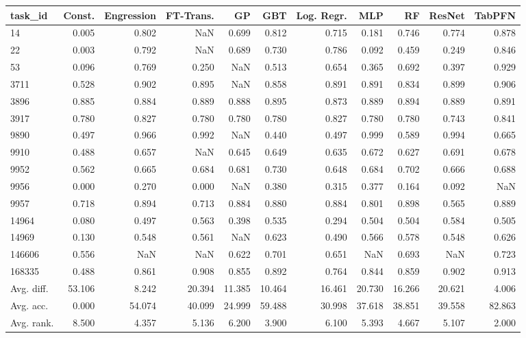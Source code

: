 \begin{tabular}{lrrrrrrrrrr}
\toprule
task\_id & Const. & Engression & FT-Trans. & GP & GBT & Log. Regr. & MLP & RF & ResNet & TabPFN \\
\midrule
14 & 0.005 & 0.802 & NaN & 0.699 & 0.812 & 0.715 & 0.181 & 0.746 & 0.774 & 0.878 \\
22 & 0.003 & 0.792 & NaN & 0.689 & 0.730 & 0.786 & 0.092 & 0.459 & 0.249 & 0.846 \\
53 & 0.096 & 0.769 & 0.250 & NaN & 0.513 & 0.654 & 0.365 & 0.692 & 0.397 & 0.929 \\
3711 & 0.528 & 0.902 & 0.895 & NaN & 0.858 & 0.891 & 0.891 & 0.834 & 0.899 & 0.906 \\
3896 & 0.885 & 0.884 & 0.889 & 0.888 & 0.895 & 0.873 & 0.889 & 0.894 & 0.889 & 0.891 \\
3917 & 0.780 & 0.827 & 0.780 & 0.780 & 0.780 & 0.827 & 0.780 & 0.780 & 0.743 & 0.841 \\
9890 & 0.497 & 0.966 & 0.992 & NaN & 0.440 & 0.497 & 0.999 & 0.589 & 0.994 & 0.665 \\
9910 & 0.488 & 0.657 & NaN & 0.645 & 0.649 & 0.635 & 0.672 & 0.627 & 0.691 & 0.678 \\
9952 & 0.562 & 0.665 & 0.684 & 0.681 & 0.730 & 0.648 & 0.684 & 0.702 & 0.666 & 0.688 \\
9956 & 0.000 & 0.270 & 0.000 & NaN & 0.380 & 0.315 & 0.377 & 0.164 & 0.092 & NaN \\
9957 & 0.718 & 0.894 & 0.713 & 0.884 & 0.880 & 0.884 & 0.801 & 0.898 & 0.565 & 0.889 \\
14964 & 0.080 & 0.497 & 0.563 & 0.398 & 0.535 & 0.294 & 0.504 & 0.504 & 0.584 & 0.505 \\
14969 & 0.130 & 0.548 & 0.561 & NaN & 0.623 & 0.490 & 0.566 & 0.578 & 0.548 & 0.626 \\
146606 & 0.556 & NaN & NaN & 0.622 & 0.701 & 0.651 & NaN & 0.693 & NaN & 0.723 \\
168335 & 0.488 & 0.861 & 0.908 & 0.855 & 0.892 & 0.764 & 0.844 & 0.859 & 0.902 & 0.913 \\
Avg. diff. & 53.106 & 8.242 & 20.394 & 11.385 & 10.464 & 16.461 & 20.730 & 16.266 & 20.621 & 4.006 \\
Avg. acc. & 0.000 & 54.074 & 40.099 & 24.999 & 59.488 & 30.998 & 37.618 & 38.851 & 39.558 & 82.863 \\
Avg. rank. & 8.500 & 4.357 & 5.136 & 6.200 & 3.900 & 6.100 & 5.393 & 4.667 & 5.107 & 2.000 \\
\bottomrule
\end{tabular}
